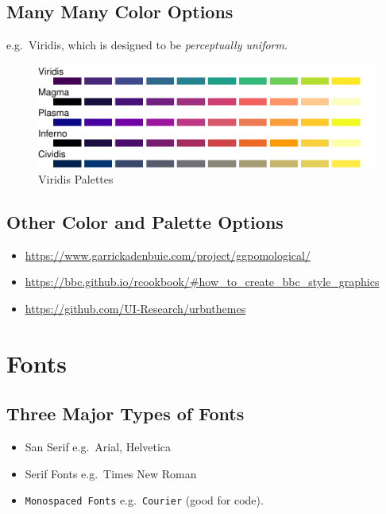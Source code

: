 \documentclass[
]{article}
\providecommand{\tightlist}{%
  \setlength{\itemsep}{0pt}\setlength{\parskip}{0pt}}
\begin{document}
\hypertarget{many-many-color-options}{%
\subsection{Many Many Color Options}\label{many-many-color-options}}

e.g.~Viridis, which is designed to be \emph{perceptually uniform}.

\begin{figure}
\centering
\includegraphics{design_files/figure-latex/unnamed-chunk-9-1.pdf}
\caption{Viridis Palettes}
\end{figure}

\hypertarget{other-color-and-palette-options}{%
\subsection{Other Color and Palette
Options}\label{other-color-and-palette-options}}

\begin{itemize}
\tightlist
\item
  \url{https://www.garrickadenbuie.com/project/ggpomological/}
\item
  \url{https://bbc.github.io/rcookbook/\#how_to_create_bbc_style_graphics}
\item
  \url{https://github.com/UI-Research/urbnthemes}
\end{itemize}

\hypertarget{fonts}{%
\section{Fonts}\label{fonts}}

\hypertarget{three-major-types-of-fonts}{%
\subsection{Three Major Types of
Fonts}\label{three-major-types-of-fonts}}

\begin{itemize}
\tightlist
\item
  San Serif e.g.~Arial, Helvetica
\item
  Serif Fonts e.g.~Times New Roman
\item
  \texttt{Monospaced\ Fonts} e.g.~\texttt{Courier} (good for code).
\end{itemize}
\end{document}
